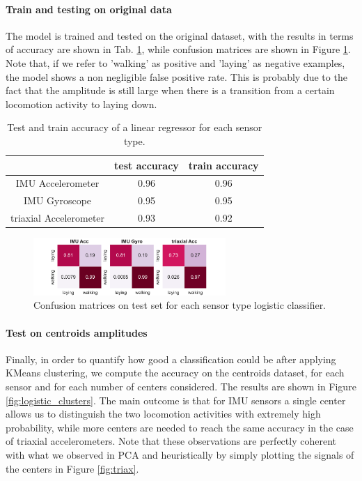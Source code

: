 \documentclass[10pt, a4paper, twocolumn]{article}
\theoremstyle{definition}
\begin{document}
\paragraph{Train and testing on original data} The model is trained and tested on the original dataset, with the results in terms of accuracy are shown in Tab. \ref{tab:regressortrain}, while confusion matrices are shown in Figure \ref{fig:cmatlogistic}. Note that, if we refer to 'walking' as positive and 'laying' as negative examples, the model shows a non negligible false positive rate. This is probably due to the fact that the amplitude is still large when there is a transition from a certain locomotion activity to laying down.

\begin{table}[]\centering
\begin{tabular}{c|cc}
                       & test accuracy & train accuracy \\ \hline
IMU Accelerometer      & 0.96          & 0.96           \\
IMU Gyroscope          & 0.95          & 0.95           \\
triaxial Accelerometer & 0.93          & 0.92          
\end{tabular}\caption{Test and train accuracy of a linear regressor for each sensor type. }\label{tab:regressortrain}
\end{table}

\begin{figure} \centering
         \includegraphics[width=0.65\textwidth]{../clustering/clustering_results_euclidean/confusion_matrix_test.pdf}
    \caption{Confusion matrices on test set for each sensor type logistic classifier.  }\label{fig:cmatlogistic}
\end{figure}


\paragraph{Test on centroids amplitudes} Finally, in order to quantify how good a classification could be after applying KMeans clustering, we compute the accuracy on the centroids dataset, for each sensor and for each number of centers considered. The results are shown in Figure \ref{fig:logistic_clusters}. The main outcome is that for IMU sensors a single center allows us to distinguish the two locomotion activities with extremely high probability, while more centers are needed to reach the same accuracy in the case of triaxial accelerometers. Note that these observations are perfectly coherent with what we observed in PCA and heuristically by simply plotting the signals of the centers in Figure \ref{fig:triax}.
\end{document}
